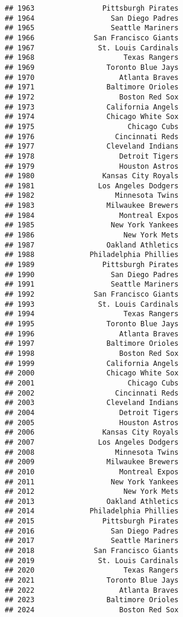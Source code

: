 \documentclass[]{article}
\begin{document}
\begin{verbatim}
## 1963                Pittsburgh Pirates
## 1964                  San Diego Padres
## 1965                  Seattle Mariners
## 1966              San Francisco Giants
## 1967               St. Louis Cardinals
## 1968                     Texas Rangers
## 1969                 Toronto Blue Jays
## 1970                    Atlanta Braves
## 1971                 Baltimore Orioles
## 1972                    Boston Red Sox
## 1973                 California Angels
## 1974                 Chicago White Sox
## 1975                      Chicago Cubs
## 1976                   Cincinnati Reds
## 1977                 Cleveland Indians
## 1978                    Detroit Tigers
## 1979                    Houston Astros
## 1980                Kansas City Royals
## 1981               Los Angeles Dodgers
## 1982                   Minnesota Twins
## 1983                 Milwaukee Brewers
## 1984                    Montreal Expos
## 1985                  New York Yankees
## 1986                     New York Mets
## 1987                 Oakland Athletics
## 1988             Philadelphia Phillies
## 1989                Pittsburgh Pirates
## 1990                  San Diego Padres
## 1991                  Seattle Mariners
## 1992              San Francisco Giants
## 1993               St. Louis Cardinals
## 1994                     Texas Rangers
## 1995                 Toronto Blue Jays
## 1996                    Atlanta Braves
## 1997                 Baltimore Orioles
## 1998                    Boston Red Sox
## 1999                 California Angels
## 2000                 Chicago White Sox
## 2001                      Chicago Cubs
## 2002                   Cincinnati Reds
## 2003                 Cleveland Indians
## 2004                    Detroit Tigers
## 2005                    Houston Astros
## 2006                Kansas City Royals
## 2007               Los Angeles Dodgers
## 2008                   Minnesota Twins
## 2009                 Milwaukee Brewers
## 2010                    Montreal Expos
## 2011                  New York Yankees
## 2012                     New York Mets
## 2013                 Oakland Athletics
## 2014             Philadelphia Phillies
## 2015                Pittsburgh Pirates
## 2016                  San Diego Padres
## 2017                  Seattle Mariners
## 2018              San Francisco Giants
## 2019               St. Louis Cardinals
## 2020                     Texas Rangers
## 2021                 Toronto Blue Jays
## 2022                    Atlanta Braves
## 2023                 Baltimore Orioles
## 2024                    Boston Red Sox

\end{verbatim}
\end{document}
